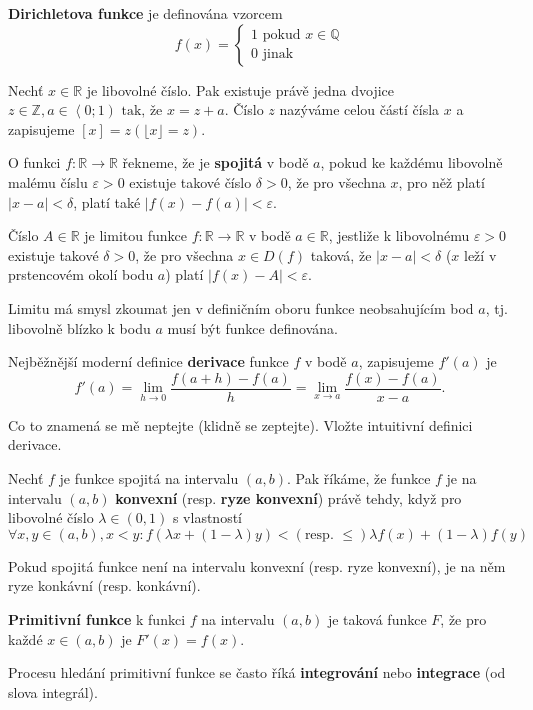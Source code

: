 \begin{definition}
  \textbf{Dirichletova funkce} je definována vzorcem
  $$f(x) = \begin{cases}
1 \text{ pokud } x \in \mathbb Q \\
0 \text{ jinak }
  \end{cases}  $$       
\end{definition}

\begin{definition}
  Nechť $x \in \mathbb{R}$ je libovolné číslo. Pak existuje právě jedna dvojice $z \in \mathbb{Z}, a \in \left \langle 0;1 \right) \text{ tak, že } x = z + a$.
Číslo $z$ nazýváme celou částí čísla $x$ a zapisujeme $[x] = z (\lfloor x \rfloor = z)$.
\end{definition}

\begin{definition}
  O funkci $f:\mathbb {R} \rightarrow \mathbb {R}$ řekneme, že je \textbf{spojitá} v bodě $a$, pokud ke každému libovolně malému číslu $\varepsilon >0$ existuje takové číslo $\delta >0$, že pro všechna $x$, pro něž platí $|x-a|<\delta$, platí také $|f(x)-f(a)|<\varepsilon$.
\end{definition}

\begin{definition}
  Číslo $A\in \mathbb {R}$ je limitou funkce $f:\mathbb {R} \rightarrow \mathbb {R}$ v bodě $ a\in \mathbb {R}$, jestliže k libovolnému $ \varepsilon >0$ existuje takové $ \delta >0$, že pro všechna $x\in D(f)$ taková, že $ \left|x-a\right|<\delta$ ($x$ leží v prstencovém okolí bodu $a$) platí $\left|f(x)-A\right|<\varepsilon $.

  Limitu má smysl zkoumat jen v definičním oboru funkce neobsahujícím bod $a$, tj. libovolně blízko k bodu $a$ musí být funkce definována.
\end{definition}

\begin{definition}
  Nejběžnější moderní definice \textbf{derivace} funkce $f$ v bodě $a$, zapisujeme $f'(a)$ je 
  $$f'(a)=\lim _{h\to 0}{\frac {f(a+h)-f(a)}{h}}=\lim _{x\to a}{\frac {f(x)-f(a)}{x-a}}.$$

  Co to znamená se mě neptejte (klidně se zeptejte). Vložte intuitivní definici derivace.
\end{definition}

\begin{definition}
  Nechť $f$ je funkce spojitá na intervalu $(a,b)$. Pak říkáme, že funkce $f$ je na intervalu $(a,b)$ \textbf{konvexní} (resp. \textbf{ryze konvexní}) právě tehdy, když pro libovolné číslo $\lambda \in (0,1)$ s vlastností $\forall x,y\in (a,b),x<y:f(\lambda x+(1-\lambda )y) < (\text{resp. } \leq) \lambda f(x)+(1-\lambda )f(y)$

  Pokud spojitá funkce není na intervalu konvexní (resp. ryze konvexní), je na něm ryze konkávní (resp. konkávní).
\end{definition}

\begin{definition}
  \textbf{Primitivní funkce} k funkci $f$ na intervalu $(a,b)$ je taková funkce $F$, že pro každé $x\in (a,b)$ je $F'(x)=f(x)$.

  Procesu hledání primitivní funkce se často říká \textbf{integrování} nebo \textbf{integrace} (od slova integrál).
\end{definition}
